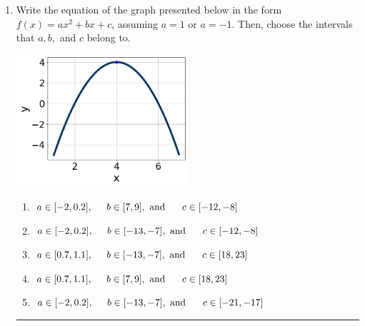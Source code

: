 \documentclass[14pt]{extbook}
\newcommand{\litem}[1]{\item#1\hspace*{-1cm}\rule{\textwidth}{0.4pt}}
\begin{document}
\begin{enumerate}
{\begin{enumerate}[label=\Alph*.]
\end{enumerate} }
\litem{
Write the equation of the graph presented below in the form $f(x)=ax^2+bx+c$, assuming  $a=1$ or $a=-1$. Then, choose the intervals that $a, b,$ and $c$ belong to.
\begin{center}
    \includegraphics[width=0.5\textwidth]{../Figures/quadraticGraphToEquationB.png}
\end{center}
\begin{enumerate}[label=\Alph*.]
\item \( a \in [-2, 0.2], \hspace*{5mm} b \in [7, 9], \text{ and } \hspace*{5mm} c \in [-12, -8] \)
\item \( a \in [-2, 0.2], \hspace*{5mm} b \in [-13, -7], \text{ and } \hspace*{5mm} c \in [-12, -8] \)
\item \( a \in [0.7, 1.1], \hspace*{5mm} b \in [-13, -7], \text{ and } \hspace*{5mm} c \in [18, 23] \)
\item \( a \in [0.7, 1.1], \hspace*{5mm} b \in [7, 9], \text{ and } \hspace*{5mm} c \in [18, 23] \)
\item \( a \in [-2, 0.2], \hspace*{5mm} b \in [-13, -7], \text{ and } \hspace*{5mm} c \in [-21, -17] \)


\end{enumerate}}
\end{enumerate}
\end{document}
